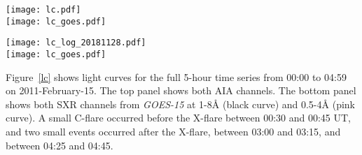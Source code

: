 \begin{figure*}[htb!]\centering
    \texttt{[image: lc.pdf]}\\
    \texttt{[image: lc\_goes.pdf]}
    \caption{%
        Top: Light curves of the
        UV continuum emission from AIA 1600\AA{} (blue curve) and
        AIA 1700\AA{} (red curve),
        integrated over the flare region in AR 11158.
        Bottom: Light curves from \textit{GOES-15}
        channels 1-8\AA{} (black curve) and 0.5-4\AA{} (pink curve),
        scaled as log(flux) to enable visibility of the increases
        during smaller events before and
        after the main X-flare.
        \label{lc}}
\end{figure*}

\begin{figure*}[htb!]\centering
    \texttt{[image: lc\_log\_20181128.pdf]}\\
    \texttt{[image: lc\_goes.pdf]}
    \caption{%
        Top:
        Same as top panel of Figure~\ref{lc}, but with AIA emission in
        log space to obtain a better comparison to the SXR emission from
        \textit{GOES}.
        \label{lc_log}}
\end{figure*}

\myfig Figure~\ref{lc} shows light curves for the full 5-hour time series
from 00:00 to 04:59 on 2011-February-15.
The top panel shows both AIA channels.
The bottom panel shows both SXR channels from \textit{GOES-15} at
1-8\AA{} (black curve) and 0.5-4\AA{} (pink curve).
A small C-flare occurred before the X-flare between 00:30 and 00:45 UT, and
two small events occurred after the X-flare,
between 03:00 and 03:15, and between 04:25 and 04:45.

